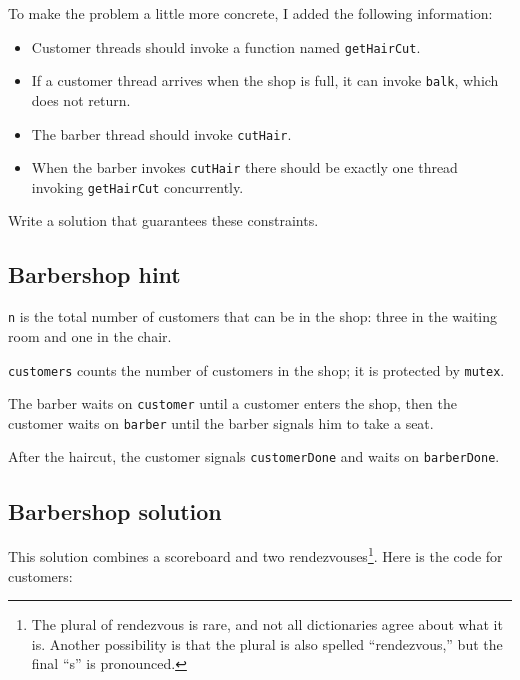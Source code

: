\documentclass{book}
\begin{document}
To make the problem a little more concrete, I added the
following information:

\begin{itemize}

    \item Customer threads should invoke a function named {\tt getHairCut}.

    \item If a customer thread arrives when the shop is full,
          it can invoke {\tt balk}, which does not return.

    \item The barber thread should invoke {\tt cutHair}.

    \item When the barber invokes {\tt cutHair} there should
          be exactly one thread invoking {\tt getHairCut} concurrently.

\end{itemize}

Write a solution that guarantees these constraints.



\subsection{Barbershop hint}



{\tt n} is the total number of customers that can be in the shop:
three in the waiting room and one in the chair.

    {\tt customers} counts the number of customers in the shop;
it is protected by {\tt mutex}.

The barber waits on {\tt customer} until a customer enters the
shop, then the customer waits on {\tt barber} until the barber
signals him to take a seat.

After the haircut, the customer signals {\tt customerDone} and
waits on {\tt barberDone}.


\subsection{Barbershop solution}

This solution combines a scoreboard and two rendezvouses\footnote{The
    plural of rendezvous is rare, and not all dictionaries agree about
    what it is.  Another possibility is that the plural is also spelled
    ``rendezvous,'' but the final ``s'' is pronounced.}.  Here is the
code for customers:
\end{document}
